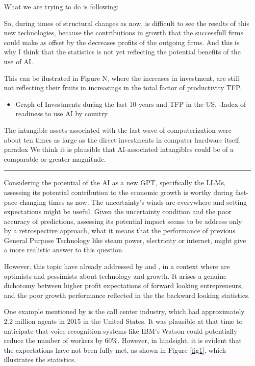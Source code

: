 \documentclass[preprint, 3p,
authoryear]{elsarticle} %
\providecommand{\tightlist}{%
  \setlength{\itemsep}{0pt}\setlength{\parskip}{0pt}}
\begin{document}
What we are trying to do is following:

So, during times of structural changes as now, is difficult to see the
results of this new technologies, because the contributions in growth
that the successfull firms could make as offset by the decreases profits
of the outgoing firms. And this is why I think that the statistics is
not yet reflecting the potential benefits of the use of AI.

This can be ilustrated in Figure N, where the increases in investment,
are still not reflecting their fruits in increasings in the total factor
of productivity TFP.

\begin{itemize}
\tightlist
\item
  Graph of Investments during the last 10 years and TFP in the US.
  -Index of readiness to use AI by country
\end{itemize}

The intangible assets associated with the last wave of computerization
were about ten times as large as the direct investments in computer
hardware itself. paradox We think it is plausible that AI-associated
intangibles could be of a comparable or greater magnitude.

\begin{center}\rule{0.5\linewidth}{0.5pt}\end{center}

Considering the potential of the AI as a new GPT, specifically the LLMs,
assessing its potential contribution to the economic growth is worthy
during fast-pace changing times as now. The uncertainty's winds are
everywhere and setting expectations might be useful. Given the
uncertainty condition and the poor accuracy of predictions, assessing
its potential impact seems to be address only by a retrospective
approach, what it means that the performance of previous General Purpose
Technology like steam power, electricity or internet, might give a more
realistic answer to this question.

However, this topic have already addressed by \citep{paradox} and
\citep{Nicholas}, in a context where are optimists and pessimists about
technology and growth. It arises a genuine dichotomy between higher
profit expectations of forward looking entrepreneurs, and the poor
growth performance reflected in the the backward looking statistics.

One example mentioned by \citep{paradox} is the call center industry,
which had approximately 2.2 million agents in 2015 in the United States.
It was plausible at that time to anticipate that voice recognition
systems like IBM's Watson could potentially reduce the number of workers
by 60\%. However, in hindsight, it is evident that the expectations have
not been fully met, as shown in Figure \ref{fig1}, which illustrates the
statistics.
\end{document}
